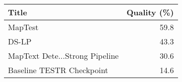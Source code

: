 \begin{tabular}{lr}
\toprule
Title & Quality (\%) \\
\midrule
MapTest & 59.8 \\
DS-LP & 43.3 \\
MapText Dete...Strong Pipeline & 30.6 \\
Baseline TESTR Checkpoint & 14.6 \\
\bottomrule
\end{tabular}
